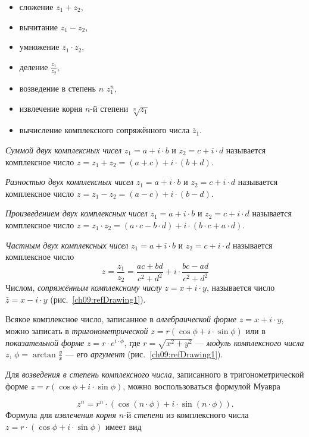 \begin{itemize}
\item сложение  $z_1+z_2$,
\item вычитание  $z_1-z_2$,
\item умножение  $z_1\cdot z_2$,
\item деление  $\frac{z_1}{z_2}$,
\item возведение в степень $n$  $z_1^n$,
\item извлечение корня $n$-й степени  $\sqrt[n]{z_1}$ 
\item вычисление комплексного сопряжённого числа  $\bar{z}_1$.
\end{itemize}
\emph{Суммой двух комплексных чисел}  $z_1=a+i\cdot b$ и  $z_2=c+i\cdot d$ называется комплексное число $z=z_1+z_2=(a+c)+i\cdot (b+d)$.

\emph{Разностью двух комплексных чисел}  $z_1=a+i\cdot b$  и  $z_2=c+i\cdot d$ называется комплексное число  $z=z_1-z_2=(a-c)+i\cdot (b-d)$.

\emph{Произведением двух комплексных чисел}  $z_1=a+i\cdot b$  и  $z_2=c+i\cdot d$  называется
комплексное число
 $z=z_1\cdot {z_2}=(a\cdot c-b\cdot d)+i\cdot (b\cdot c+a\cdot d)$.

\emph{Частным двух комплексных чисел}  $z_1=a+i\cdot b$  и  $z_2=c+i\cdot d$ называется комплексное
число
\begin{equation*}
z=\frac{z_1}{z_2}=\frac{ac+bd}{c^2+d^2}+i\cdot {\frac{bc-ad}{c^2+d^2}}
\end{equation*}
Числом, \emph{сопряжённым комплексному числу} 
$z=x+i\cdot y$,  называется число  $\bar{z}=x-i\cdot y$ (рис.~\ref{ch09:refDrawing1}).

Всякое комплексное число, записанное в \emph{алгебраической форме}  $z=x+i\cdot y$,
можно записать в \emph{тригонометрической}  $z=r(\cos \phi+i\cdot \sin \phi)$ или в
\emph{показательной форме}  $z=r\cdot e^{i\cdot \phi}$, где  $r=\sqrt{x^2+y^2}$ ---
\emph{модуль комплексного числа}  $z$,  $\phi=\arctan \frac{y}{x}$ --- его \emph{аргумент}
(рис.~\ref{ch09:refDrawing1}).

Для \emph{возведения в степень комплексного числа}, записанного в тригонометрической форме  $z=r(\cos
\phi+i\cdot \sin \phi)$, можно воспользоваться формулой Муавра

\begin{equation*}
z^n=r^n\cdot (\cos (n\cdot \phi)+i\cdot \sin (n\cdot \phi)).
\end{equation*}
Формула для \emph{извлечения корня} $n$-й \emph{степени} из комплексного
числа  $z=r\cdot (\cos \phi+i\cdot \sin \phi)$ имеет вид

